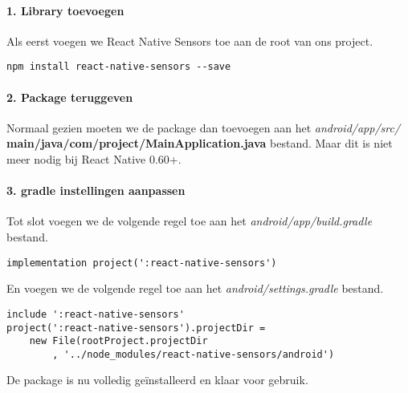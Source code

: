 \paragraph{1. Library toevoegen}
Als eerst voegen we React Native Sensors toe aan de root van ons project.
\begin{verbatim}
npm install react-native-sensors --save
\end{verbatim}

\paragraph{2. Package teruggeven}
Normaal gezien moeten we de package dan toevoegen aan het 
\textit{android/app/src/} \textbf{main/java/com/project/MainApplication.java} bestand.
Maar dit is niet meer nodig bij React Native 0.60+.

\paragraph{3. gradle instellingen aanpassen}
Tot slot voegen we de volgende regel toe aan het \textit{android/app/build.gradle} bestand.
\begin{verbatim}
implementation project(':react-native-sensors')
\end{verbatim}
En voegen we de volgende regel toe aan het \textit{android/settings.gradle} bestand.
\begin{verbatim}
include ':react-native-sensors'
project(':react-native-sensors').projectDir = 
    new File(rootProject.projectDir
        , '../node_modules/react-native-sensors/android')
\end{verbatim}
De package is nu volledig geïnstalleerd en klaar voor gebruik.

